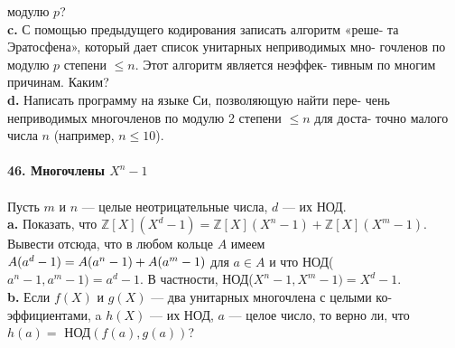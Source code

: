 \documentclass{mai_book}
\begin{document}
модулю $p$?\\
\hspace*{10pt}\textbf{c.} С помощью предыдущего кодирования записать алгоритм «реше-\linebreak
та Эратосфена», который дает список унитарных неприводимых мно-\linebreak
гочленов по модулю $p$ степени $\leq n$. Этот алгоритм является неэффек-\linebreak
тивным по многим причинам. Каким?\\
\hspace*{10pt}\textbf{d.} Написать программу на языке Си, позволяющую найти пере-\linebreak
чень неприводимых многочленов по модулю 2 степени $\leq n$ для доста-\linebreak
точно малого числа $n$ (например, $n\leq 10$).
\\
\\
\noindent\textbf{46. Многочлены $X^n-1$}\\\\
\hspace*{10pt}Пусть $m$ и $n$ — целые неотрицательные числа, $d$ — их НОД.\\
\hspace*{10pt}\textbf{a.} Показать, что $\mathbb{Z}[X](X^d - 1) = \mathbb{Z}[X](X^n - 1) + \mathbb{Z}[X](X^m - 1)$.\linebreak
Вывести отсюда, что в любом кольце $A$ имеем $A(a^d - 1) = A(a^n - 1) +\linebreak
A(a^m - 1)$ для $a \in A$ и что НОД($a^n-1, a^m - 1) = a^d - 1$. В частности,\linebreak
НОД($X^n - 1 ,X^m - 1) =X^d - 1$.\\
\hspace*{10pt}\textbf{b.} Если $f(X )$ и $g(X)$ — два унитарных многочлена с целыми ко-\linebreak
эффициентами, a $h(X)$ — их НОД, $a$ — целое число, то верно ли, что\linebreak
$h(a) =$ НОД$(f(a), g(a))$?\pagebreak

\end{document}
